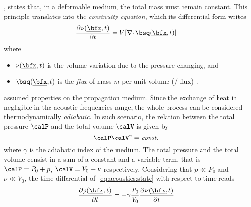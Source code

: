 , states that, in a deformable medium, the total mass must remain constant.
This principle translates into the \textit{continuity equation}, which its differential form writes
\begin{equation}
    \label{eq:acoustics:continuity}
    \kpderiv[]{\volumeUnit\depSpaceTime}{t} = V \kbracket{\divergence{\flux\depSpaceTime}}
\end{equation}
where
\begin{itemize}
    \item $\volumeUnit\depSpaceTime$ is the volume variation due to the pressure changing, and
    \item $\flux\depSpaceTime$ is the \textit{flux} of mass $m$ per unit volume (\aka/ flux)
    .
\end{itemize}

 assumed properties on the propagation medium.
Since the exchange of heat in negligible in the acoustic frequencies range,
the whole process can be considered thermodynamically \textit{adiabatic}.
In such scenario, the relation between the total pressure $\calP$ and the total volume $\volume$ is given by
\begin{equation}
    \label{eq:acoustics:state}
    \calP \volume^\gamma = \const
\end{equation}
where $\gamma$ is the adiabatic index of the medium.
The total pressure and the total volume consist in a sum of a constant and a variable term,
that is $\calP = P_0 + p$,
$\volume = V_0 + \nu$ respectively.
Considering that $p \ll P_0$ and $\nu \ll V_0$, the time-differential of~\cref{eq:acoustics:state} with respect to time reads
\begin{equation}
    \label{eq:acoustics:statediff}
    \kpderiv[]{\pressureSpaceTime}{t} = - \gamma \frac{P_0}{V_0} \kpderiv[]{\nu\depSpaceTime}{t}
\end{equation}

